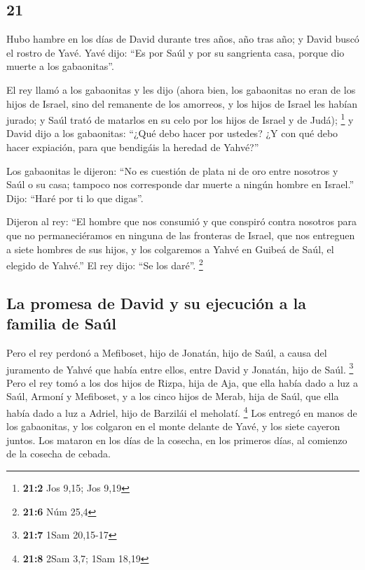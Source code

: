 \begin{paracol}{2}
\hypertarget{section-40}{%
\section{21}\label{section-40}}

 Hubo hambre en los días de David durante tres años, año
tras año; y David buscó el rostro de Yavé. Yavé dijo: ``Es por Saúl y
por su sangrienta casa, porque dio muerte a los gabaonitas''.

 El rey llamó a los gabaonitas y les dijo (ahora bien, los
gabaonitas no eran de los hijos de Israel, sino del remanente de los
amorreos, y los hijos de Israel les habían jurado; y Saúl trató de
matarlos en su celo por los hijos de Israel y de Judá); \footnote{\textbf{21:2}
  Jos 9,15; Jos 9,19}  y David dijo a los gabaonitas:
``¿Qué debo hacer por ustedes? ¿Y con qué debo hacer expiación, para que
bendigáis la heredad de Yahvé?''

 Los gabaonitas le dijeron: ``No es cuestión de plata ni
de oro entre nosotros y Saúl o su casa; tampoco nos corresponde dar
muerte a ningún hombre en Israel.'' Dijo: ``Haré por ti lo que digas''.

 Dijeron al rey: ``El hombre que nos consumió y que
conspiró contra nosotros para que no permaneciéramos en ninguna de las
fronteras de Israel,  que nos entreguen a siete hombres de
sus hijos, y los colgaremos a Yahvé en Guibeá de Saúl, el elegido de
Yahvé.'' El rey dijo: ``Se los daré''. \footnote{\textbf{21:6} Núm 25,4}

\hypertarget{la-promesa-de-david-y-su-ejecuciuxf3n-a-la-familia-de-sauxfal}{%
\subsection{La promesa de David y su ejecución a la familia de
Saúl}\label{la-promesa-de-david-y-su-ejecuciuxf3n-a-la-familia-de-sauxfal}}

 Pero el rey perdonó a Mefiboset, hijo de Jonatán, hijo de
Saúl, a causa del juramento de Yahvé que había entre ellos, entre David
y Jonatán, hijo de Saúl. \footnote{\textbf{21:7} 1Sam 20,15-17}
 Pero el rey tomó a los dos hijos de Rizpa, hija de Aja,
que ella había dado a luz a Saúl, Armoní y Mefiboset, y a los cinco
hijos de Merab, hija de Saúl, que ella había dado a luz a Adriel, hijo
de Barzilái el meholatí. \footnote{\textbf{21:8} 2Sam 3,7; 1Sam 18,19}
 Los entregó en manos de los gabaonitas, y los colgaron en
el monte delante de Yavé, y los siete cayeron juntos. Los mataron en los
días de la cosecha, en los primeros días, al comienzo de la cosecha de
cebada.


\end{paracol}

